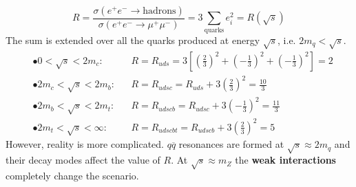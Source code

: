 \documentclass[10.75pt,a4paper,openright,bottom=2cm]{article}
\begin{document}
\[
R=\frac{\sigma(e^+e^-\to\text{hadrons})}{\sigma(e^+e^-\to\mu^+\mu^-)}=3\sum_{\text{quarks}}e_i^2=R(\sqrt{s})
\]
The sum is extended over all the quarks produced at energy $\sqrt{s}$, i.e. $2m_q<\sqrt{s}$.
\[
\begin{aligned}
&\bullet 0<\sqrt{s}<2m_c: &&R=R_{uds}=3\left[\left(\frac{2}{3}\right)^2+\left(-\frac{1}{3}\right)^2+\left(-\frac{1}{3}\right)^2\right]=2\\
&\bullet 2m_c<\sqrt{s}<2m_b: &&R=R_{udsc}=R_{uds}+3\left(\frac{2}{3}\right)^2=\frac{10}{3}\\
&\bullet 2m_b<\sqrt{s}<2m_t: &&R=R_{udscb}=R_{udsc}+3\left(-\frac{1}{3}\right)^2=\frac{11}{3}\\
&\bullet 2m_t<\sqrt{s}<\infty: &&R=R_{udscbt}=R_{udscb}+3\left(\frac{2}{3}\right)^2=5
\end{aligned}
\]
However, reality is more complicated. $q\overline{q}$ resonances are formed at $\sqrt{s}\approx2m_q$ and their decay modes affect the value of $R$. At $\sqrt{s}\approx m_Z$ the \textbf{weak interactions} completely change the scenario.
\end{document}
